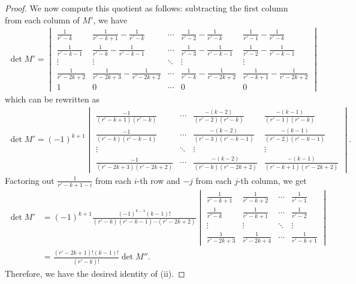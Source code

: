 \documentclass[11pt]{amsart}
\theoremstyle{definition}
\numberwithin{equation}{subsection}
\theoremstyle{plain}
\theoremstyle{plain}
\theoremstyle{plain}
\theoremstyle{plain}
\theoremstyle{plain}
\theoremstyle{plain}
\theoremstyle{plain}
\theoremstyle{plain}
\theoremstyle{plain}
\theoremstyle{plain}
\theoremstyle{plain}
\theoremstyle{plain}
\theoremstyle{definition}
\theoremstyle{definition}
\theoremstyle{definition}
\theoremstyle{remark}
\renewcommand{\(}{\textup{(}}
\renewcommand{\)}{\textup{)}}
\begin{document}
\begin{proof}
We now compute this quotient as follows: subtracting the first column from each column of $M'$, we have
\begin{align*}
        \det M'=
        \begin{vmatrix}
          \frac{1}{r'-k} & \frac{1}{r'-k+1}-\frac{1}{r'-k} & \cdots
           & \frac{1}{r'-2}-\frac{1}{r'-k} & \frac{1}{r'-1}-\frac{1}{r'-k} \\
          \frac{1}{r'-k-1} & \frac{1}{r'-k}-\frac{1}{r'-k-1} & \cdots
           & \frac{1}{r'-3}-\frac{1}{r'-k-1} & \frac{1}{r'-2}-\frac{1}{r'-k-1} \\
          \vdots & \vdots & \ddots & \vdots & \vdots \\
          \frac{1}{r'-2k+2} & \frac{1}{r'-2k+3}-\frac{1}{r'-2k+2} & \cdots
           & \frac{1}{r'-k}-\frac{1}{r'-2k+2} & \frac{1}{r'-k+1}-\frac{1}{r'-2k+2} \\
          1 & 0 & \cdots & 0 & 0
        \end{vmatrix}
\end{align*}
which can be rewritten as
\begin{align*}
\det M'= (-1)^{k+1}
        \begin{vmatrix}
          \frac{-1}{(r'-k+1)(r'-k)} & \cdots
           & \frac{-(k-2)}{(r'-2)(r'-k)} & \frac{-(k-1)}{(r'-1)(r'-k)} \\
          \frac{-1}{(r'-k)(r'-k-1)} & \cdots
           & \frac{-(k-2)}{(r'-3)(r'-k-1)} & \frac{-(k-1)}{(r'-2)(r'-k-1)} \\
          \vdots & \ddots & \vdots & \vdots \\
          \frac{-1}{(r'-2k+3)(r'-2k+2)} & \cdots
           & \frac{-(k-2)}{(r'-k)(r'-2k+2)} & \frac{-(k-1)}{(r'-k+1)(r'-2k+2)}
        \end{vmatrix}.
    \end{align*}
Factoring out $\frac{1}{r'-k+1-i}$ from each $i$-th row and $-j$ from each $j$-th column, we get
    \begin{align*}
    \det M'
        &=
        (-1)^{k+1}\frac{(-1)^{k-1}(k-1)!}{(r'-k)(r'-k-1)\cdots(r'-2k+2)}
        \begin{vmatrix}
          \frac{1}{r'-k+1} & \frac{1}{r'-k+2} & \cdots & \frac{1}{r'-1} \\
          \frac{1}{r'-k} & \frac{1}{r'-k+1} & \cdots & \frac{1}{r'-2} \\
          \vdots & \vdots & \ddots & \vdots \\
          \frac{1}{r'-2k+3} & \frac{1}{r'-2k+4} & \cdots & \frac{1}{r'-k+1}
        \end{vmatrix}\\
        &=
        \frac{(r'-2k+1)!(k-1)!}{(r'-k)!}\det M''.
    \end{align*}
Therefore, we have the desired identity of (ii).


\end{proof}
\end{document}
